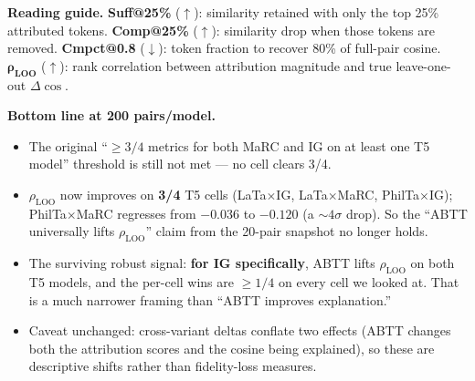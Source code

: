 \documentclass[11pt]{article}
\begin{document}
\noindent\textbf{Reading guide.}
\textbf{Suff@25\%} ($\uparrow$): similarity retained with only the top 25\% attributed tokens.
\textbf{Comp@25\%} ($\uparrow$): similarity drop when those tokens are removed.
\textbf{Cmpct@0.8} ($\downarrow$): token fraction to recover 80\% of full-pair cosine.
$\boldsymbol{\rho_{\text{LOO}}}$ ($\uparrow$): rank correlation between attribution magnitude and true leave-one-out $\Delta\cos$.

\vspace{0.4em}

\noindent\textbf{Bottom line at 200 pairs/model.}
\begin{itemize}
\itemsep0em
\item The original ``$\geq 3/4$ metrics for both MaRC and IG on at least one T5 model'' threshold is still not met --- no cell clears 3/4.
\item $\rho_{\text{LOO}}$ now improves on \textbf{3/4} T5 cells (LaTa$\times$IG, LaTa$\times$MaRC, PhilTa$\times$IG); PhilTa$\times$MaRC regresses from $-0.036$ to $-0.120$ (a $\sim 4\sigma$ drop). So the ``ABTT universally lifts $\rho_{\text{LOO}}$'' claim from the 20-pair snapshot no longer holds.
\item The surviving robust signal: \textbf{for IG specifically}, ABTT lifts $\rho_{\text{LOO}}$ on both T5 models, and the per-cell wins are $\geq 1/4$ on every cell we looked at. That is a much narrower framing than ``ABTT improves explanation.''
\item Caveat unchanged: cross-variant deltas conflate two effects (ABTT changes both the attribution scores and the cosine being explained), so these are descriptive shifts rather than fidelity-loss measures.
\end{itemize}
\end{document}
